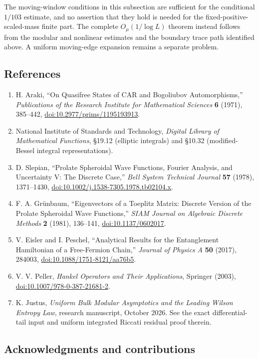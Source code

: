 \documentclass[
  10pt,
  a4paper,
]{article}
\begin{document}
The moving-window conditions in this subsection are sufficient for the conditional \(1/103\) estimate, and no assertion that they hold is needed for the fixed-positive-scaled-mass finite part. The complete \(O_\mu(1/\log L)\) theorem instead follows from the modular and nonlinear estimates and the boundary trace path identified above. A uniform moving-edge expansion remains a separate problem.

\subsection{References}\label{references}

\begin{enumerate}
\def\labelenumi{\arabic{enumi}.}
\item
  H. Araki, ``On Quasifree States of CAR and Bogoliubov Automorphisms,'' \emph{Publications of the Research Institute for Mathematical Sciences} \textbf{6} (1971), 385--442, \url{doi:10.2977/prims/1195193913}.
\item
  National Institute of Standards and Technology, \emph{Digital Library of Mathematical Functions}, §19.12 (elliptic integrals) and §10.32 (modified-Bessel integral representations).
\item
  D. Slepian, ``Prolate Spheroidal Wave Functions, Fourier Analysis, and Uncertainty V: The Discrete Case,'' \emph{Bell System Technical Journal} \textbf{57} (1978), 1371--1430, \url{doi:10.1002/j.1538-7305.1978.tb02104.x}.
\item
  F. A. Grünbaum, ``Eigenvectors of a Toeplitz Matrix: Discrete Version of the Prolate Spheroidal Wave Functions,'' \emph{SIAM Journal on Algebraic Discrete Methods} \textbf{2} (1981), 136--141, \url{doi:10.1137/0602017}.
\item
  V. Eisler and I. Peschel, ``Analytical Results for the Entanglement Hamiltonian of a Free-Fermion Chain,'' \emph{Journal of Physics A} \textbf{50} (2017), 284003, \url{doi:10.1088/1751-8121/aa76b5}.
\item
  V. V. Peller, \emph{Hankel Operators and Their Applications}, Springer (2003), \url{doi:10.1007/978-0-387-21681-2}.
\item
  K. Justus, \emph{Uniform Bulk Modular Asymptotics and the Leading Wilson Entropy Law}, research manuscript, October 2026. See the exact differential-tail input and uniform integrated Riccati residual proof therein.
\end{enumerate}

\subsection{Acknowledgments and contributions}\label{acknowledgments-and-contributions}
\end{document}
